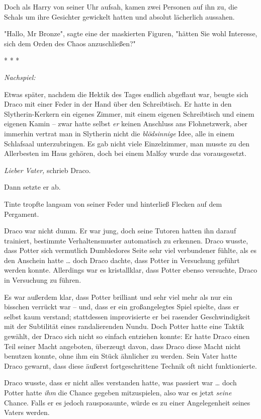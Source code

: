 {Doch als Harry von seiner Uhr aufsah, kamen zwei Personen auf ihn zu, die Schals um ihre Gesichter gewickelt hatten und absolut lächerlich aussahen.

"Hallo, Mr Bronze", sagte eine der maskierten Figuren, "hätten Sie wohl Interesse, sich dem Orden des Chaos anzuschließen?"

* * *

\emph{Nachspiel:}

Etwas später, nachdem die Hektik des Tages endlich abgeflaut war, beugte sich Draco mit einer Feder in der Hand über den Schreibtisch. Er hatte in den Slytherin-Kerkern ein eigenes Zimmer, mit einem eigenen Schreibtisch und einem eigenen Kamin -- zwar hatte selbst \emph{er} keinen Anschluss ans Flohnetzwerk, aber immerhin vertrat man in Slytherin nicht die \emph{blödsinnige} Idee, alle in einem Schlafsaal unterzubringen. Es gab nicht viele Einzelzimmer, man musste zu den Allerbesten im Haus gehören, doch bei einem Malfoy wurde das vorausgesetzt.

\emph{Lieber Vater,} schrieb Draco.

Dann setzte er ab.

Tinte tropfte langsam von seiner Feder und hinterließ Flecken auf dem Pergament.

Draco war nicht dumm. Er war jung, doch seine Tutoren hatten ihn darauf trainiert, bestimmte Verhaltensmuster automatisch zu erkennen. Draco wusste, dass Potter sich vermutlich Dumbledores Seite sehr viel verbundener fühlte, als es den Anschein hatte … doch Draco dachte, dass Potter in Versuchung geführt werden konnte. Allerdings war es kristallklar, dass Potter ebenso versuchte, Draco in Versuchung zu führen.

Es war außerdem klar, dass Potter brilliant und sehr viel mehr als nur ein bisschen verrückt war -- und, dass er ein großangelegtes Spiel spielte, dass er selbst kaum verstand; stattdessen improvisierte er bei rasender Geschwindigkeit mit der Subtilität eines randalierenden Nundu. Doch Potter hatte eine Taktik gewählt, der Draco sich nicht so einfach entziehen konnte: Er hatte Draco einen Teil seiner Macht angeboten, überzeugt davon, dass Draco diese Macht nicht benutzen konnte, ohne ihm ein Stück ähnlicher zu werden. Sein Vater hatte Draco gewarnt, dass diese äußerst fortgeschrittene Technik oft nicht funktionierte.

Draco wusste, dass er nicht alles verstanden hatte, was passiert war … doch Potter hatte \emph{ihm} die Chance gegeben mitzuspielen, also war es jetzt \emph{seine} Chance. Falls er es jedoch rausposaunte, würde es zu einer Angelegenheit seines Vaters werden.

}

